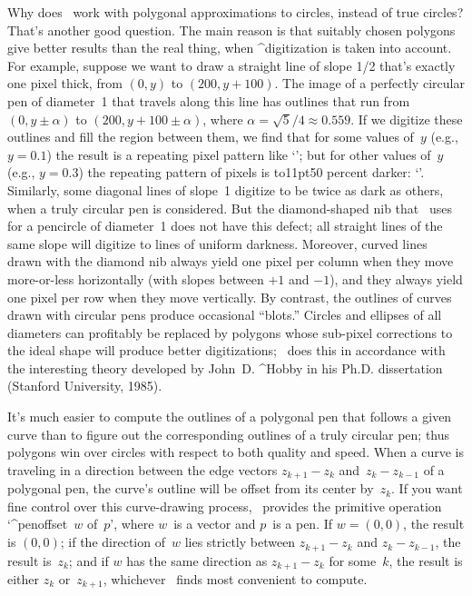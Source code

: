 {{{{\danger Why does \MF\ work with polygonal approximations to circles,
instead of true circles? That's another good question. The main reason is
that suitably chosen polygons give better results than the real thing,
when ^{digitization} is taken into account. For example, suppose we want
to draw a straight line of slope 1/2 that's exactly one pixel thick, from
$(0,y)$ to $(200,y+100)$. The image of a perfectly circular pen of
diameter~1 that travels along this line has outlines that run from
$(0,y\pm\alpha)$ to $(200,y+100\pm\alpha)$, where
$\alpha=\sqrt5/4\approx0.559$. If we digitize these outlines and fill the
region between them, we find that for some values of~$y$ (e.g., $y=0.1$)
the result is a repeating pixel pattern like
`'; but for other values of~$y$ (e.g.,
$y=0.3$) the repeating pattern of pixels is \vbox to11pt{}50 percent darker:
`'. Similarly, some diagonal
lines of slope~1 digitize to be twice as dark as others, when a truly
circular pen is considered. But the diamond-shaped nib that \MF\ uses
for a pencircle of diameter~1 does not have this defect; all straight
lines of the same slope will digitize to lines of uniform darkness.
Moreover, curved lines drawn with the diamond nib always yield one pixel per
column when they move more-or-less horizontally (with slopes between $+1$
and $-1$), and they always yield one pixel per row when they move vertically.
By contrast, the outlines of curves drawn with circular pens produce
occasional ``blots.'' Circles and ellipses of all diameters can profitably
be replaced by polygons whose sub-pixel corrections to the ideal shape
will produce better digitizations; \MF\ does this in accordance with the
interesting theory developed by John~D. ^{Hobby} in his Ph.D.
dissertation (Stanford University, 1985).

\ddanger It's much easier to compute the outlines of a polygonal pen that
follows a given curve than to figure out the corresponding outlines of
a truly circular pen; thus polygons win over circles with respect
to both quality and speed. When a curve is traveling in a
direction between the edge vectors $z_{k+1}-z_k$ and~$z_k-z_{k-1}$ of
a polygonal pen, the curve's outline will be offset from its center
by~$z_k$. If you want fine control over this curve-drawing process,
\MF\ provides the primitive operation `^{penoffset}~$w$ of~$p$', where
$w$~is a vector and $p$~is a pen. If $w=(0,0)$, the result is $(0,0)$;
if the direction of~$w$ lies strictly between $z_{k+1}-z_k$ and $z_k
-z_{k-1}$, the result is~$z_k$; and if $w$ has the same direction as
$z_{k+1}-z_k$ for some~$k$, the result is either $z_k$ or~$z_{k+1}$,
whichever \MF\ finds most convenient to compute.

}}}}
